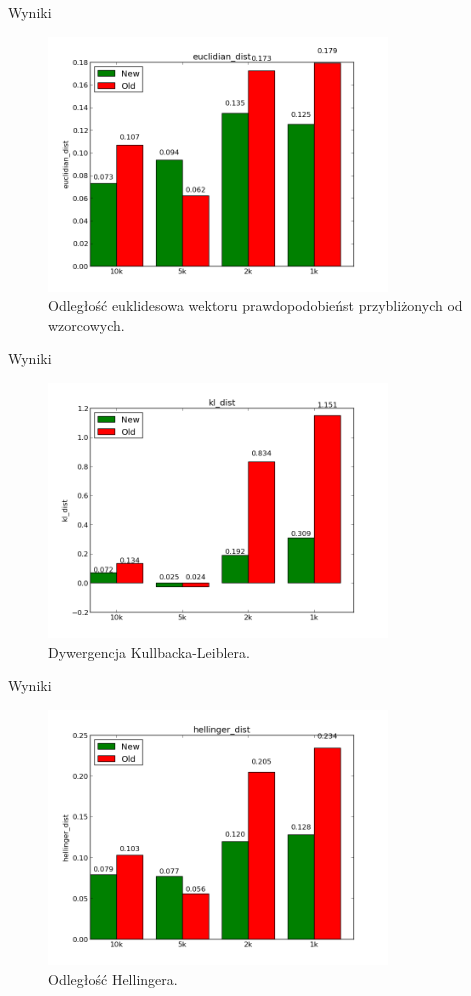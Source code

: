 \documentclass{beamer}
\begin{document}
\begin{frame}{Wyniki}
	\begin{figure}[h!]
		\centering
		\includegraphics[width=9cm]{euclidian_dist.png}
		\caption{Odległość euklidesowa wektoru prawdopodobieńst przybliżonych od wzorcowych.}
	\end{figure}
\end{frame}

\begin{frame}{Wyniki}
	\begin{figure}[h!]
		\centering
		\includegraphics[width=9cm]{kl_dist.png}
		\caption{Dywergencja Kullbacka-Leiblera.}
	\end{figure}
\end{frame}

\begin{frame}{Wyniki}
	\begin{figure}[h!]
		\centering
		\includegraphics[width=9cm]{hellinger_dist.png}
		\caption{Odległość Hellingera.}
	\end{figure}
\end{frame}
\end{document}
